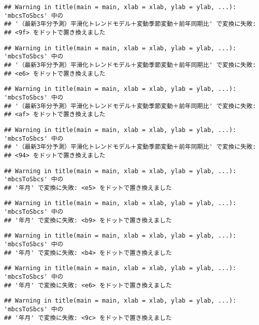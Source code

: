 \documentclass[]{article}
\begin{document}
\begin{verbatim}
## Warning in title(main = main, xlab = xlab, ylab = ylab, ...): 'mbcsToSbcs' 中の
## '（最新3年分予測）平滑化トレンドモデル＋変動季節変動＋前年同期比' で変換に失敗:
## <9f> をドットで置き換えました
\end{verbatim}

\begin{verbatim}
## Warning in title(main = main, xlab = xlab, ylab = ylab, ...): 'mbcsToSbcs' 中の
## '（最新3年分予測）平滑化トレンドモデル＋変動季節変動＋前年同期比' で変換に失敗:
## <e6> をドットで置き換えました
\end{verbatim}

\begin{verbatim}
## Warning in title(main = main, xlab = xlab, ylab = ylab, ...): 'mbcsToSbcs' 中の
## '（最新3年分予測）平滑化トレンドモデル＋変動季節変動＋前年同期比' で変換に失敗:
## <af> をドットで置き換えました
\end{verbatim}

\begin{verbatim}
## Warning in title(main = main, xlab = xlab, ylab = ylab, ...): 'mbcsToSbcs' 中の
## '（最新3年分予測）平滑化トレンドモデル＋変動季節変動＋前年同期比' で変換に失敗:
## <94> をドットで置き換えました
\end{verbatim}

\begin{verbatim}
## Warning in title(main = main, xlab = xlab, ylab = ylab, ...): 'mbcsToSbcs' 中の
## '年月' で変換に失敗: <e5> をドットで置き換えました
\end{verbatim}

\begin{verbatim}
## Warning in title(main = main, xlab = xlab, ylab = ylab, ...): 'mbcsToSbcs' 中の
## '年月' で変換に失敗: <b9> をドットで置き換えました
\end{verbatim}

\begin{verbatim}
## Warning in title(main = main, xlab = xlab, ylab = ylab, ...): 'mbcsToSbcs' 中の
## '年月' で変換に失敗: <b4> をドットで置き換えました
\end{verbatim}

\begin{verbatim}
## Warning in title(main = main, xlab = xlab, ylab = ylab, ...): 'mbcsToSbcs' 中の
## '年月' で変換に失敗: <e6> をドットで置き換えました
\end{verbatim}

\begin{verbatim}
## Warning in title(main = main, xlab = xlab, ylab = ylab, ...): 'mbcsToSbcs' 中の
## '年月' で変換に失敗: <9c> をドットで置き換えました
\end{verbatim}
\end{document}

